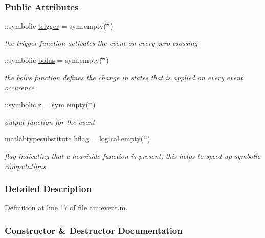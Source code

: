 \subsubsection*{Public Attributes}
\begin{DoxyCompactItemize}
\item 
\+::symbolic \mbox{\hyperlink{classamievent_ae194cb817eae4085f8023885100c68dd}{trigger}} = sym.\+empty(\char`\"{}\char`\"{})
\begin{DoxyCompactList}\small\item\em the trigger function activates the event on every zero crossing \end{DoxyCompactList}\item 
\+::symbolic \mbox{\hyperlink{classamievent_ab9227561ac246ee4b70f9e65c25ffda7}{bolus}} = sym.\+empty(\char`\"{}\char`\"{})
\begin{DoxyCompactList}\small\item\em the bolus function defines the change in states that is applied on every event occurence \end{DoxyCompactList}\item 
\+::symbolic \mbox{\hyperlink{classamievent_a25ed1bcb423b0b7200f485fc5ff71c8e}{z}} = sym.\+empty(\char`\"{}\char`\"{})
\begin{DoxyCompactList}\small\item\em output function for the event \end{DoxyCompactList}\item 
matlabtypesubstitute \mbox{\hyperlink{classamievent_ab98347b5ce6fbe7bd007030346b88575}{hflag}} = logical.\+empty(\char`\"{}\char`\"{})
\begin{DoxyCompactList}\small\item\em flag indicating that a heaviside function is present, this helps to speed up symbolic computations \end{DoxyCompactList}\end{DoxyCompactItemize}


\subsubsection{Detailed Description}


Definition at line 17 of file amievent.\+m.



\subsubsection{Constructor \& Destructor Documentation}
\mbox{\label{classamievent_a64b7d5a2d9dc65a982f1f9812949b865}} 
